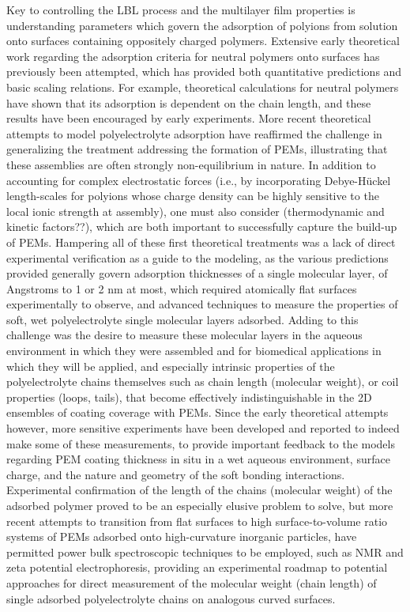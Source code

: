 \documentclass[journal=mamobx,manuscript=article]{achemso}
\begin{document}
Key to controlling the LBL process and the multilayer film properties is understanding parameters which govern the adsorption of polyions from solution onto surfaces containing oppositely charged polymers\cite{Schonhoff2003}.  
Extensive early theoretical work regarding the adsorption criteria for neutral polymers onto surfaces has previously been attempted, which has provided both quantitative predictions\cite{Fleer1982,Baumgartner1991} and basic scaling relations.\cite{DeGennes1976,Alexander1977}  
For example, theoretical calculations for neutral polymers have shown that its adsorption is dependent on the chain length,\cite{Stuart1980} and these results have been encouraged by early experiments.\cite{Stuart1980,Felter1970}  
More recent theoretical attempts to model polyelectrolyte adsorption have reaffirmed the challenge in generalizing the treatment addressing the formation of PEMs\cite{Szilagyi2014}, illustrating that these assemblies are often strongly non-equilibrium in nature.  In addition to accounting for complex electrostatic forces (i.e., by incorporating Debye-H\"uckel length-scales for polyions whose charge density can be highly sensitive to the local ionic strength at assembly),\cite{Chatellier1996} one must also consider (thermodynamic and kinetic factors??), which are both important to successfully capture the build-up of PEMs.\cite{Kovacevic2002} 
Hampering all of these first theoretical treatments was a lack of direct experimental verification as a guide to the modeling, as the various predictions provided generally govern adsorption thicknesses of a single molecular layer, of Angstroms to 1 or 2 nm at most, which required atomically flat surfaces experimentally to observe, and advanced techniques to measure the properties of soft, wet polyelectrolyte single molecular layers adsorbed.  Adding to this challenge was the desire to measure these molecular layers in the aqueous environment in which they were assembled and for biomedical applications in which they will be applied, and especially intrinsic properties of the polyelectrolyte chains themselves such as chain length (molecular weight), or coil properties (loops, tails), that become effectively indistinguishable in the 2D ensembles of coating coverage with PEMs.   Since the early theoretical attempts however, more sensitive experiments have been developed and reported to indeed make some of these measurements, to provide important feedback to the models regarding PEM coating thickness in situ in a wet aqueous environment, surface charge, and the nature and geometry of the soft bonding interactions.\cite{Smith2004,Tanchak2004,Harroun2005,Burke2005,Tanchak2006}   Experimental confirmation of the length of the chains (molecular weight) of the adsorbed polymer proved to be an especially elusive problem to solve, but more recent attempts to transition from flat surfaces to high surface-to-volume ratio systems of PEMs adsorbed onto high-curvature inorganic particles, have permitted power bulk spectroscopic techniques to be employed, such as NMR and zeta potential electrophoresis,\cite{Burke2003,Mermut2003,Smith2004,Smith2003} providing an experimental roadmap to potential approaches for direct measurement of the molecular weight (chain length) of single adsorbed polyelectrolyte chains on analogous curved surfaces.
\end{document}
